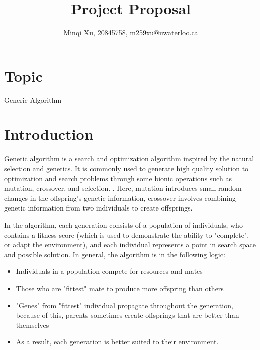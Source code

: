 \documentclass[letterpaper, 10 pt, conference]{ieeeconf}  %
\title{\LARGE \bf Project Proposal}
\author{Minqi Xu, 20845758, m259xu@uwaterloo.ca} %
\begin{document}
\onecolumn
\maketitle
%
%

\section{Topic}
Generic Algorithm









\section{Introduction}

Genetic algorithm is a search and optimization algorithm inspired by 
the natural selection and genetics. It is commonly used to generate high
quality solution to optimization and search problems through some bionic
operations such as mutation, crossover, and selection. \cite{wikiga}. Here,
mutation introduces small random changes in the offspring's genetic information,
crossover involves combining genetic information from two individuals to create
offsprings.

In the algorithm, each generation consists of a population of individuals,
who contains a fitness score (which is used to demonstrate the ability to
"complete", or adapt the environment), and each individual represents a point
in search space and possible solution. In general, the algorithm is in the following
logic:
\begin{itemize}
    \item Individuals in a population compete for resources and mates
    \item Those who are "fittest" mate to produce more offspring than others
    \item "Genes" from "fittest" individual propagate throughout the generation, because of this, parents sometimes create offsprings that are better than themselves
    \item As a result, each generation is better suited to their environment. \cite{gfg}
\end{itemize}
\end{document}
